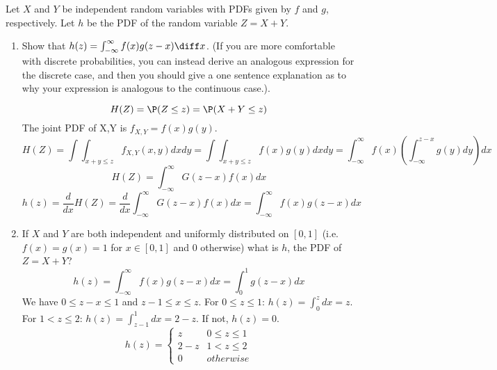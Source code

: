 \documentclass{article}
\begin{document}
\noindent\makebox[\linewidth]{\rule{\textwidth}{0.4pt}}
\begin{aprob}
    Let $X$ and $Y$ be independent random variables with PDFs given by $f$ and $g$, respectively.
    Let $h$ be the PDF of the random variable $Z = X+Y$.
    \begin{enumerate}
        \item {} Show that $h(z) = \int_{-\infty}^\infty f(x) g( z - x ) \diff x $.  (If you are more comfortable with discrete probabilities, you can instead derive an analogous expression for the discrete case,  and then you should give a one sentence explanation as to why your expression is analogous to the continuous case.).
        
        \begin{equation}
        H(Z) = \P(Z \leq z) = \P(X + Y \leq z)
        \end{equation}
        The joint PDF of X,Y is $f_{X,Y} = f(x)g(y)$. 
        \begin{equation}
        H(Z) = \int \int_{x+y \leq z} f_{X,Y}(x,y) dxdy = \int \int_{x+y \leq z} f(x)g(y) dxdy = \int_{-\infty}^{\infty} f(x) \left( \int_{-\infty}^{z-x}g(y)dy \right) dx
        \end{equation}
        \begin{equation}
        H(Z) = \int_{-\infty}^{\infty} G(z-x)f(x)dx
        \end{equation}
        \begin{equation}
        h(z) = \frac{d}{dx}  H(Z) = \frac{d}{dx} \int_{-\infty}^{\infty}G(z-x)f(x)dx = \int_{-\infty}^{\infty}f(x)g(z-x)dx
        \end{equation}
        \item {} If $X$ and $Y$ are both independent and uniformly distributed on $[0,1]$ (i.e. $f(x)=g(x)=1$ for $x \in [0,1]$ and $0$ otherwise) what is $h$, the PDF of $Z=X+Y$?
        \begin{equation}
        h(z) = \int_{-\infty}^{\infty}f(x)g(z-x)dx = \int_{0}^{1}g(z-x)dx
        \end{equation}
        We have $0 \leq z-x \leq 1$ and $z-1 \leq x \leq z$. For $0 \leq z \leq 1$: $h(z) = \int_{0}^{z} dx = z$. For $1 	< z \leq 2$: $h(z) = \int_{z-1}^{1} dx = 2-z$. If not, $h(z) = 0$. 
        \[ h(z)= \begin{cases} 
        z & 0 \leq z \leq 1 \\
        2-z & 1 < z \leq 2 \\
        0 & otherwise 
        \end{cases}
        \]
    \end{enumerate}

\end{aprob}
\end{document}
